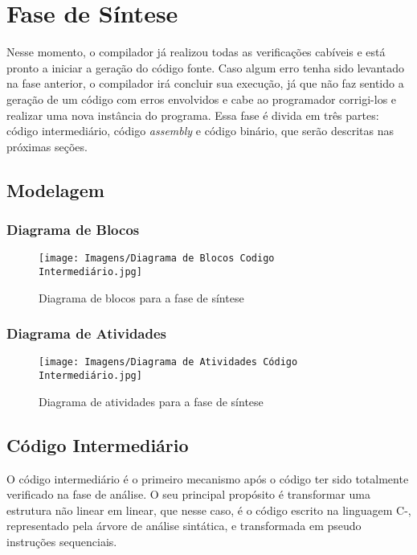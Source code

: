 \documentclass[
	12pt,				%
	oneside,
	a4paper,			%
	english,			%
	french,				%
	spanish,			%
	brazil,				%
	]{abntex2}
\begin{document}
\section{Fase de Síntese}

Nesse momento, o compilador já realizou todas as verificações cabíveis e está pronto a iniciar a geração do código fonte. Caso algum erro tenha sido levantado na fase anterior, o compilador irá concluir sua execução, já que não faz sentido a geração de um código com erros envolvidos e cabe ao programador corrigi-los e realizar uma nova instância do programa. Essa fase é divida em três partes: código intermediário, código \emph{assembly} e código binário, que serão descritas nas próximas seções.

\subsection{Modelagem}

\subsubsection{Diagrama de Blocos}

\begin{figure}[H]
\centering 
\caption{Diagrama de blocos para a fase de síntese} \label{fig:DiagramaBlocosSintese}
\graphicspath{ {./Imagens/} } 
\texttt{[image: Imagens/Diagrama de Blocos Codigo Intermediário.jpg]}
\end{figure}


\subsubsection{Diagrama de Atividades}

\begin{figure}[H]
\centering 
\caption{Diagrama de atividades para a fase de síntese} \label{fig:DiagramaAtividadesSintese}
\graphicspath{ {./Imagens/} } 
\texttt{[image: Imagens/Diagrama de Atividades Código Intermediário.jpg]}
\end{figure}


\subsection{Código Intermediário}

O código intermediário é o primeiro mecanismo após o código ter sido totalmente verificado na fase de análise. O seu principal propósito é transformar uma estrutura não linear em linear, que nesse caso, é o código escrito na linguagem C-, representado pela árvore de análise sintática, e transformada em pseudo instruções sequenciais.
\end{document}
